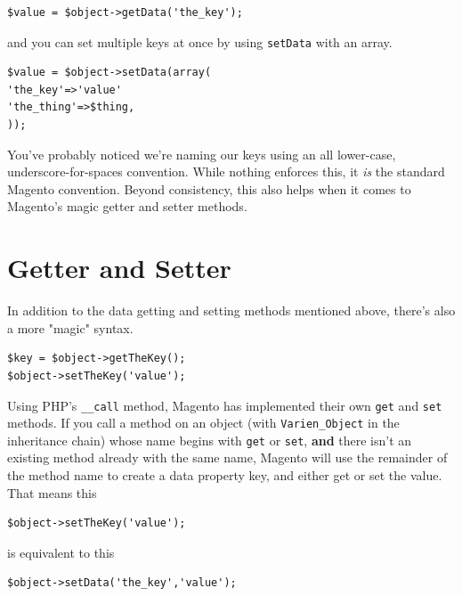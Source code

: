 \documentclass[oneside]{book}
\begin{document}
\begin{lstlisting}
$value = $object->getData('the_key');

\end{lstlisting}


and you can set multiple keys at once by using \footnotesize\texttt{setData} \normalsize  with an array.

\begin{lstlisting}
$value = $object->setData(array(
'the_key'=>'value'
'the_thing'=>$thing,
));

\end{lstlisting}


You've probably noticed we're naming our keys using an all lower-case, underscore-for-spaces convention.  While nothing enforces this, it \emph{is} the standard Magento convention.  Beyond consistency, this also helps when it comes to Magento's magic getter and setter methods.

\section{Getter and Setter}

In addition to the data getting and setting methods mentioned above, there's also a more "magic" syntax.

\begin{lstlisting}
$key = $object->getTheKey();
$object->setTheKey('value');

\end{lstlisting}


Using PHP's \footnotesize\texttt{\_\_call} \normalsize  method, Magento has implemented their own \footnotesize\texttt{get} \normalsize  and \footnotesize\texttt{set} \normalsize  methods.  If you call a method on an object (with \footnotesize\texttt{Varien\_Object} \normalsize in the inheritance chain) whose name begins with \footnotesize\texttt{get} \normalsize  or \footnotesize\texttt{set}\normalsize, \textbf{and} there isn't an existing method already with the same name, Magento will use the remainder of the method name to create a data property key, and either get or set the value.  That means this

\begin{lstlisting}
$object->setTheKey('value');

\end{lstlisting}


is equivalent to this

\begin{lstlisting}
$object->setData('the_key','value');

\end{lstlisting}
\end{document}
